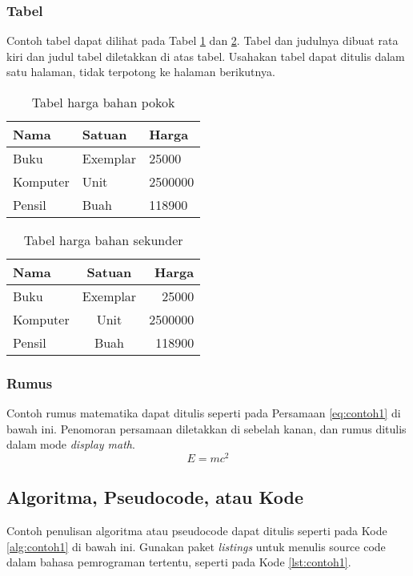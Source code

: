 \documentclass[12pt,a4paper,oneside]{book}
\begin{document}
\subsubsection{Tabel}
Contoh tabel dapat dilihat pada Tabel \ref{tbl:harga1} dan \ref{tbl:harga2}. Tabel dan judulnya dibuat rata kiri dan judul tabel diletakkan di atas tabel. Usahakan tabel dapat ditulis dalam satu halaman, tidak terpotong ke halaman berikutnya.

\begin{table}[t] %
  \begin{tabular}{ | p{2cm} | p{2cm} | p{3cm} |}
	\hline
	Nama 	& Satuan 		& Harga \\
	\hline
	Buku 	& Exemplar	& 25000 \\
	Komputer	& Unit		& 2500000 \\
	Pensil	& Buah		& 118900 \\
	\hline
	\end{tabular}
\caption{Tabel harga bahan pokok}
\label{tbl:harga1}
\end{table}

\begin{table}[h] %
	\begin{tabular}{ | l | c | r | }
	\hline
	Nama 	& Satuan 		& Harga \\
	\hline
	Buku 	& Exemplar	& 25000 \\
	Komputer	& Unit		& 2500000 \\
	Pensil	& Buah		& 118900 \\
	\hline
	\end{tabular}
\caption{Tabel harga bahan sekunder}
\label{tbl:harga2}
\end{table}

\subsubsection{Rumus}
Contoh rumus matematika dapat ditulis seperti pada Persamaan \ref{eq:contoh1} di bawah ini. 
Penomoran persamaan diletakkan di sebelah kanan, dan rumus ditulis dalam mode \textit{display math}.
\begin{equation}
E = mc^2
\label{eq:contoh1}
\end{equation}

\subsection{Algoritma, Pseudocode, atau Kode}
Contoh penulisan algoritma atau pseudocode dapat ditulis seperti pada Kode \ref{alg:contoh1} di bawah ini. 
Gunakan paket \textit{listings} untuk menulis source code dalam bahasa pemrograman tertentu, seperti pada Kode \ref{lst:contoh1}. 
\end{document}
